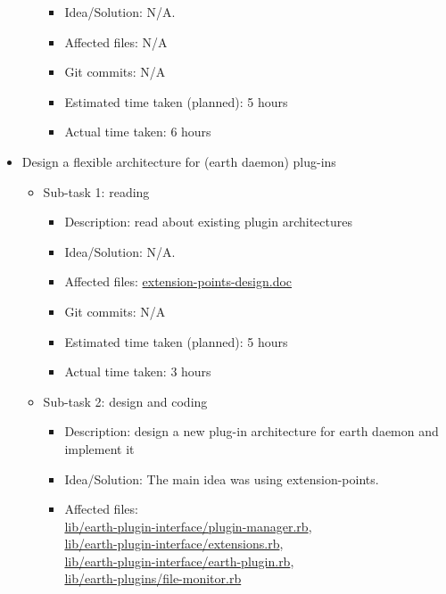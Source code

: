 \documentclass{article}
\begin{document}
\begin{itemize}
\begin{itemize}
\begin{itemize}
					\item Idea/Solution: N/A. 
					\item Affected files: N/A
					\item Git commits: N/A
					\item Estimated time taken (planned): 5 hours
					\item Actual time taken: 6 hours
				\end{itemize}
	     \end{itemize}
	\item Design a flexible architecture for (earth daemon) plug-ins
		\begin{itemize}
		\item Sub-task 1: reading
			\begin{itemize}
				\item Description: read about existing plugin architectures
				\item Idea/Solution: N/A.
				\item Affected files: \href{https://github.com/pamalite/segp2/tree/master/Subgroups/plugin_group/Documents/Design/extension_points_design.doc}{extension-points-design.doc}
				\item Git commits: N/A
				\item Estimated time taken (planned): 5 hours
				\item Actual time taken: 3 hours
			\end{itemize}
		\item Sub-task 2: design and coding
			\begin{itemize}
				\item Description: design a new plug-in architecture for earth daemon and implement it 
				\item Idea/Solution: The main idea was using extension-points.
				\item Affected files: \\
\href{http://github.com/mfbDev/earth/tree/metadata_as_plugin/lib/earth_plugin_interface/plugin_manager.rb}{lib/earth-plugin-interface/plugin-manager.rb},\\
\href{http://github.com/mfbDev/earth/tree/metadata_as_plugin/lib/earth_plugin_interface/extensions.rb}{lib/earth-plugin-interface/extensions.rb},\\
\href{http://github.com/mfbDev/earth/tree/metadata_as_plugin/lib/earth_plugin_interface/earth_plugin.rb}{lib/earth-plugin-interface/earth-plugin.rb},\\
\href{http://github.com/mfbDev/earth/tree/metadata_as_plugin/lib/earth_plugins/file_monitor.rb}{lib/earth-plugins/file-monitor.rb}


\end{itemize}
\end{itemize}
\end{itemize}
\end{document}
